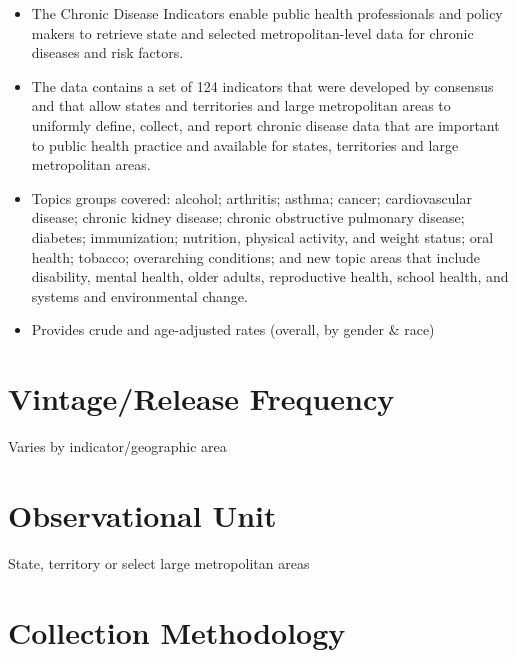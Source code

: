 \documentclass[
]{book}
\providecommand{\tightlist}{%
  \setlength{\itemsep}{0pt}\setlength{\parskip}{0pt}}
\begin{document}
\begin{itemize}
\tightlist
\item
  The Chronic Disease Indicators enable public health professionals and policy makers to retrieve state and selected metropolitan-level data for chronic diseases and risk factors.
\item
  The data contains a set of 124 indicators that were developed by consensus and that allow states and territories and large metropolitan areas to uniformly define, collect, and report chronic disease data that are important to public health practice and available for states, territories and large metropolitan areas.
\item
  Topics groups covered: alcohol; arthritis; asthma; cancer; cardiovascular disease; chronic kidney disease; chronic obstructive pulmonary disease; diabetes; immunization; nutrition, physical activity, and weight status; oral health; tobacco; overarching conditions; and new topic areas that include disability, mental health, older adults, reproductive health, school health, and systems and environmental change.
\item
  Provides crude and age-adjusted rates (overall, by gender \& race)
\end{itemize}

\hypertarget{vintagerelease-frequency-16}{%
\section{Vintage/Release Frequency}\label{vintagerelease-frequency-16}}

Varies by indicator/geographic area

\hypertarget{observational-unit-16}{%
\section{Observational Unit}\label{observational-unit-16}}

State, territory or select large metropolitan areas

\hypertarget{collection-methodology-16}{%
\section{Collection Methodology}\label{collection-methodology-16}}
\end{document}
